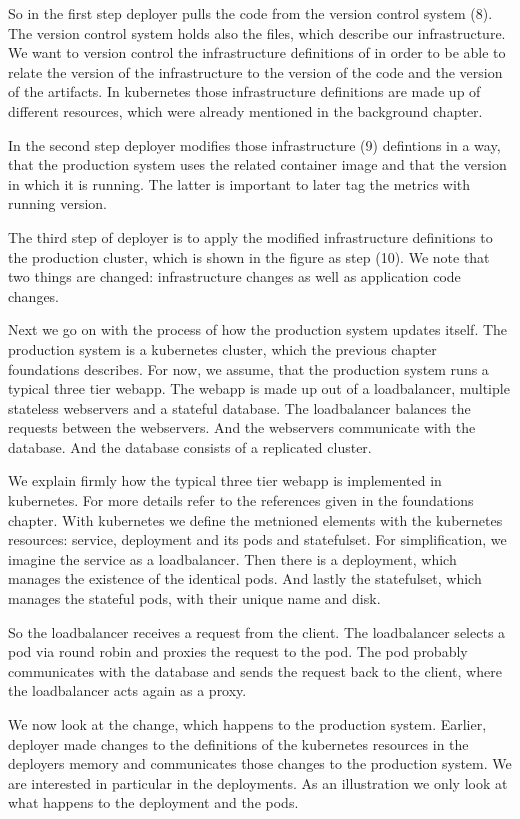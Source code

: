 So in the first step deployer pulls the code from the version control system (8). The version control system holds also the
files, which describe our infrastructure. We want to version control the infrastructure definitions of in order to be able to relate the version of the infrastructure to the
version of the code and the version of the artifacts. In kubernetes those infrastructure
definitions are made up of different resources, which were already mentioned in the
background chapter.

In the second step deployer modifies those infrastructure (9) defintions in a way, that the production system uses the related container image and that the version in which it is running. The latter is
important to later tag the metrics with running version.

The third step of deployer is to apply the modified
infrastructure definitions to the production cluster, which is shown in the figure as step (10). We note that two things are changed: infrastructure changes as well as application code changes.

Next we go on with the process of how the production system updates itself. The production
system is a kubernetes cluster, which the previous chapter foundations describes. For now,
we assume, that the production system runs a typical three tier webapp. The webapp is made
up out of a loadbalancer, multiple stateless webservers and a stateful database. The
loadbalancer balances the requests between the webservers. And the webservers communicate
with the database. And the database consists of a replicated cluster.

We explain firmly how the typical three tier webapp is implemented in kubernetes. For more
details refer to the references given in the foundations chapter. With kubernetes we
define the metnioned elements with the kubernetes resources: service, deployment and its
pods and statefulset. For simplification, we imagine the service as a loadbalancer. Then
there is a deployment, which manages the existence of the identical pods. And lastly the
statefulset, which manages the stateful pods, with their unique name and disk.

So the loadbalancer receives a request from the client. The loadbalancer selects a pod via
round robin and proxies the request to the pod. The pod probably communicates with the
database and sends the request back to the client, where the loadbalancer acts again as
a proxy.

We now look at the change, which happens to the production system. Earlier, deployer made
changes to the definitions of the kubernetes resources in the deployers memory and
communicates those changes to the production system. We are interested in particular in
the deployments. As an illustration we only look at what happens to the deployment and the
pods.

